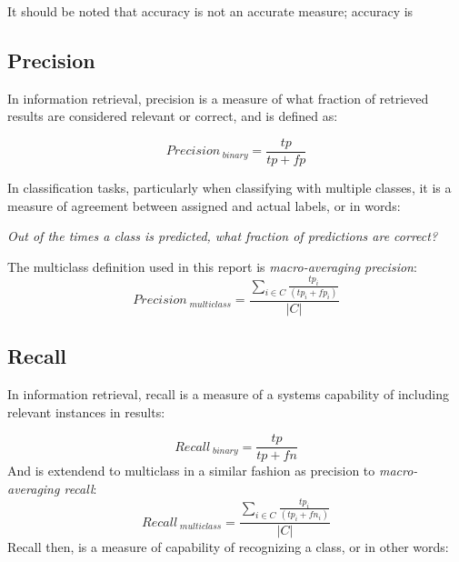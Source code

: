 \documentclass[a4paper,11pt]{kth-mag}
\begin{document}
It should be noted that accuracy is not an accurate measure; accuracy is 





\subsection{Precision}
In information retrieval, precision is a measure of what fraction of retrieved
results are considered relevant or correct, and is defined as\cite{rijsbergen1979v}:

\begin{equation} \label{eq:precision}
Precision_{\;binary} =  \frac{tp}{tp + fp}
\end{equation}

In classification tasks, particularly when classifying with multiple classes,
it is a measure of agreement between assigned and actual labels,
or in words:

\emph{Out of the times a class is predicted, what fraction of predictions are correct?}


The multiclass definition used in this report is \emph{macro-averaging precision}\cite{sokolova2009systematic}:
\begin{equation} \label{eq:multiprecision}
Precision_{\;multiclass} =  \frac{\sum_{i \in C} \frac{ tp_i}{(tp_i + fp_i)}}{|C|}
\end{equation}


\subsection{Recall}
In information retrieval, recall is a measure of a systems capability of including
relevant instances in results\cite{rijsbergen1979v}:

\begin{equation} \label{eq:recall}
Recall_{\;binary} = \frac{tp}{tp + fn}
\end{equation}
And is extendend to multiclass in a similar fashion as precision to \emph{macro-averaging recall}\cite{sokolova2009systematic}:
\begin{equation} \label{eq:multirecall}
Recall_{\;multiclass} =  \frac{\sum_{i \in C} \frac{ tp_i}{(tp_i + fn_i)}}{|C|}
\end{equation}
Recall then, is a measure of capability of recognizing a class, or in other words:
\end{document}
